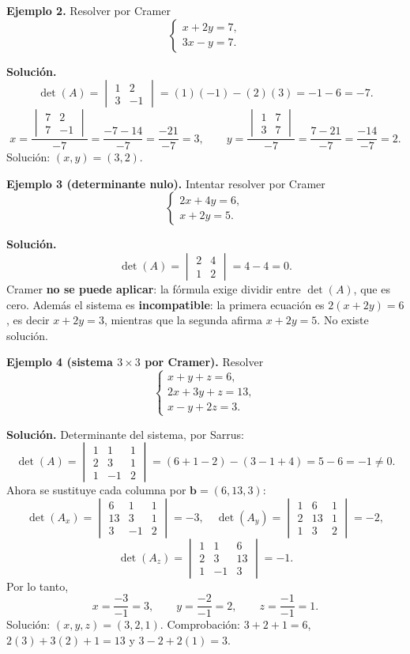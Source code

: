 \documentclass[12pt, letterpaper]{article}
\newcommand{\mwdet}[1]{\ensuremath{\begin{vmatrix}#1\end{vmatrix}}}
\begin{document}
\begin{cuadrosolucion}
  \small
  \textbf{Ejemplo 2.} Resolver por Cramer
  \[
    \begin{cases}
      x+2y=7,\\
      3x-y=7.
    \end{cases}
  \]

  \medskip
  \textbf{Solución.}
  \[
    \det(A)=\mwdet{1&2\\3&-1}=(1)(-1)-(2)(3)=-1-6=-7.
  \]
  \[
    x=\frac{\mwdet{7&2\\7&-1}}{-7}
     =\frac{-7-14}{-7}=\frac{-21}{-7}=3,
    \qquad
    y=\frac{\mwdet{1&7\\3&7}}{-7}
     =\frac{7-21}{-7}=\frac{-14}{-7}=2.
  \]
  Solución: $(x,y)=(3,2)$.
\end{cuadrosolucion}

\begin{cuadrosolucion}
  \small
  \textbf{Ejemplo 3 (determinante nulo).} Intentar resolver por Cramer
  \[
    \begin{cases}
      2x+4y=6,\\
      x+2y=5.
    \end{cases}
  \]

  \medskip
  \textbf{Solución.}
  \[
    \det(A)=\mwdet{2&4\\1&2}=4-4=0.
  \]
  Cramer \textbf{no se puede aplicar}: la fórmula exige dividir entre
  $\det(A)$, que es cero. Además el sistema es \textbf{incompatible}: la
  primera ecuación es $2(x+2y)=6$, es decir $x+2y=3$, mientras que la
  segunda afirma $x+2y=5$. No existe solución.
\end{cuadrosolucion}

\begin{cuadrosolucion}
  \small
  \textbf{Ejemplo 4 (sistema $3\times3$ por Cramer).} Resolver
  \[
    \begin{cases}
      x+y+z=6,\\
      2x+3y+z=13,\\
      x-y+2z=3.
    \end{cases}
  \]

  \medskip
  \textbf{Solución.} Determinante del sistema, por Sarrus:
  \[
    \det(A)=\mwdet{1&1&1\\2&3&1\\1&-1&2}
    =(6+1-2)-(3-1+4)=5-6=-1\neq0.
  \]
  Ahora se sustituye cada columna por $\mathbf{b}=(6,13,3)$:
  \[
    \det(A_x)=\mwdet{6&1&1\\13&3&1\\3&-1&2}=-3,
    \quad
    \det(A_y)=\mwdet{1&6&1\\2&13&1\\1&3&2}=-2,
  \]
  \[
    \det(A_z)=\mwdet{1&1&6\\2&3&13\\1&-1&3}=-1.
  \]
  Por lo tanto,
  \[
    x=\frac{-3}{-1}=3,\qquad
    y=\frac{-2}{-1}=2,\qquad
    z=\frac{-1}{-1}=1.
  \]
  Solución: $(x,y,z)=(3,2,1)$. Comprobación: $3+2+1=6$,
  $2(3)+3(2)+1=13$ y $3-2+2(1)=3$. \checkmark
\end{cuadrosolucion}
\end{document}
